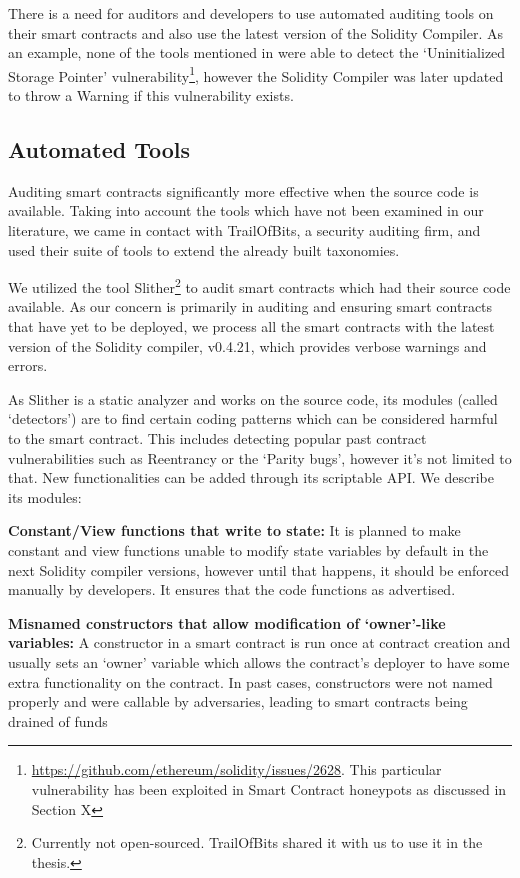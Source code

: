 There is a need for auditors and developers to use automated auditing tools on their smart contracts and also use the latest version of the Solidity  Compiler. As an example, none of the tools mentioned in \cite{tools} were able to detect the `Uninitialized Storage Pointer' vulnerability\footnote{\url{https://github.com/ethereum/solidity/issues/2628}. This particular vulnerability has been exploited in Smart Contract honeypots as discussed in Section X}, however the Solidity Compiler was later updated to throw a Warning if this vulnerability exists. 

\subsection{Automated Tools}\label{slither}

Auditing smart contracts significantly more effective when the source code is available. Taking into account the tools which have not been examined in our literature, we came in contact with TrailOfBits, a security auditing firm, and used their suite of tools to extend the already built taxonomies.

We utilized the tool Slither\footnote{Currently not open-sourced. TrailOfBits shared it with us to use it in the thesis.} to audit smart contracts which had their source code available. As our concern is primarily in auditing and ensuring smart contracts that have yet to be deployed, we process all the smart contracts with the latest version of the Solidity compiler, v0.4.21, which provides verbose warnings and errors. 

As Slither is a static analyzer and works on the source code, its modules (called `detectors') are to find certain coding patterns which can be considered harmful to the smart contract. This includes detecting popular past contract vulnerabilities such as Reentrancy or the `Parity bugs', however it's not limited to that. New functionalities can be added through its scriptable API. We describe its modules:

\textbf{Constant/View functions that write to state:} It is planned to make constant and view functions unable to modify state variables by default in the next Solidity compiler versions, however until that happens, it should be enforced manually by developers. It ensures that the code functions as advertised.

\textbf{Misnamed constructors that allow modification of `owner'-like variables:} A constructor in a smart contract is run once at contract creation and usually sets an `owner' variable which allows the contract's deployer to have some extra functionality on the contract. In past cases, constructors were not named properly and were callable by adversaries, leading to smart contracts being drained of funds \cite{Atzei:2017:SAE:3080353.3080363}

